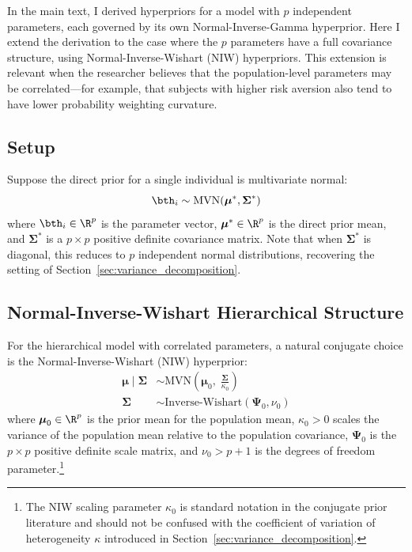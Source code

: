 \label{app:full_cov}

In the main text, I derived hyperpriors for a model with $p$ independent
parameters, each governed by its own Normal-Inverse-Gamma hyperprior. Here I
extend the derivation to the case where the $p$ parameters have a full
covariance structure, using Normal-Inverse-Wishart (NIW) hyperpriors. This
extension is relevant when the researcher believes that the population-level
parameters may be correlated---for example, that subjects with higher risk
aversion also tend to have lower probability weighting curvature.

\subsection{Setup}

Suppose the direct prior for a single individual is multivariate normal:
\begin{equation}
  \label{eq:mv_direct_prior}
  \bth_i \sim \text{MVN}(\boldsymbol{\mu}^*, \boldsymbol{\Sigma}^*)
\end{equation}
where $\bth_i \in \R^p$ is the parameter vector,
$\boldsymbol{\mu}^* \in \R^p$ is the direct prior mean, and
$\boldsymbol{\Sigma}^*$ is a $p \times p$ positive definite covariance matrix.
Note that when $\boldsymbol{\Sigma}^*$ is diagonal, this reduces to $p$
independent normal distributions, recovering the setting of
Section~\ref{sec:variance_decomposition}.

\subsection{Normal-Inverse-Wishart Hierarchical Structure}

For the hierarchical model with correlated parameters, a natural conjugate
choice is the Normal-Inverse-Wishart (NIW) hyperprior:
\begin{align}
  \label{eq:niw_mu}
  \boldsymbol{\mu} \mid \boldsymbol{\Sigma} &\sim
    \text{MVN}\!\left(\boldsymbol{\mu}_0,\;
    \frac{\boldsymbol{\Sigma}}{\kappa_0}\right) \\[4pt]
  \label{eq:niw_sigma}
  \boldsymbol{\Sigma} &\sim \text{Inverse-Wishart}(\boldsymbol{\Psi}_0, \nu_0)
\end{align}
where $\boldsymbol{\mu}_0 \in \R^p$ is the prior mean for the
population mean, $\kappa_0 > 0$ scales the variance of the population mean
relative to the population covariance, $\boldsymbol{\Psi}_0$ is the $p \times
p$ positive definite scale matrix, and $\nu_0 > p + 1$ is the degrees of
freedom parameter.\footnote{
  The NIW scaling parameter $\kappa_0$ is standard notation in the conjugate
  prior literature and should not be confused with the coefficient of variation
  of heterogeneity $\kappa$ introduced in
  Section~\ref{sec:variance_decomposition}.
}

